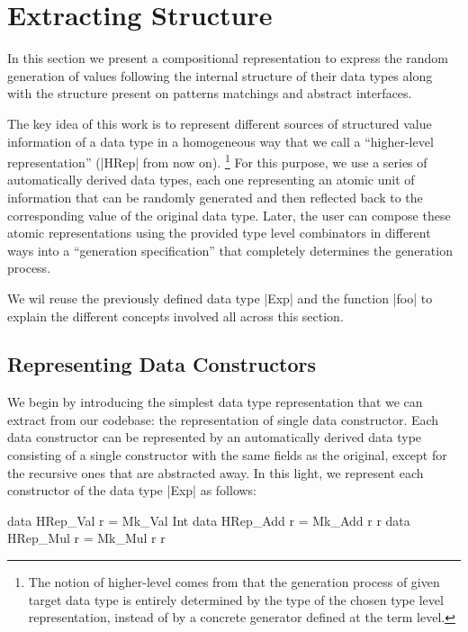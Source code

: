 \section{Extracting Structure} \label{sec:hrep}

In this section we present a compositional representation to express the random
generation of values following the internal structure of their data types along
with the structure present on patterns matchings and abstract interfaces.


The key idea of this work is to represent different sources of structured value
information of a data type in a homogeneous way that we call a ``higher-level
representation'' (|HRep| from now on).%
\footnote{The notion of higher-level comes from that the generation process of
  given target data type is entirely determined by the type of the chosen type
  level representation, instead of by a concrete generator defined at the term
  level.}
%
For this purpose, we use a series of automatically derived data types, each one
representing an atomic unit of information that can be randomly generated and
then reflected back to the corresponding value of the original data type.
%
Later, the user can compose these atomic representations using the provided type
level combinators in different ways into a ``generation specification'' that
completely determines the generation process.


We wil reuse the previously defined data type |Exp| and the function |foo| to
explain the different concepts involved all across this section.


\subsection*{\textbf{Representing Data Constructors}}

We begin by introducing the simplest data type representation that we can
extract from our codebase: the representation of single data constructor.
%
Each data constructor can be represented by an automatically derived data type
consisting of a single constructor with the same fields as the original, except
for the recursive ones that are abstracted away.
%
In this light, we represent each constructor of the data type |Exp| as follows:

\begin{code}
data HRep_Val  r = Mk_Val Int
data HRep_Add  r = Mk_Add r r
data HRep_Mul  r = Mk_Mul r r
\end{code}

